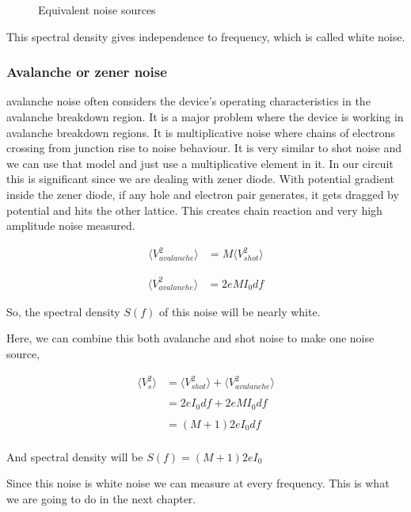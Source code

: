 \documentclass[12pt]{article}
\begin{document}
\begin{figure}[hbt!]
\caption{Equivalent noise sources}
\end{figure}

This spectral density gives independence to frequency, which is called white noise. 


\subsubsection{Avalanche or zener noise \label{than}}

avalanche noise often considers the device's operating characteristics in the avalanche breakdown region. It is a major problem where the device is working in avalanche breakdown regions. It is multiplicative noise where chains of electrons crossing from junction rise to noise behaviour. It is very similar to shot noise and we can use that model and just use a multiplicative element in it. In our circuit this is significant since we are dealing with zener diode. With potential gradient inside the zener diode, if any hole and electron pair generates, it gets dragged by potential and hits the other lattice. This creates chain reaction and very high amplitude noise measured.


\begin{align*}
\langle V_{avalanche}^2\rangle & = M \langle V_{shot}^2\rangle
\end{align*}

\begin{align}\label{thavvo}
\langle V_{avalanche}^2\rangle & = 2 e M I_0 df
\end{align}

So, the spectral density $S(f)$ of this noise will be nearly white.
 
Here, we can combine this both avalanche and shot noise to make one noise source,

\begin{align*}
\langle V_{s}^2\rangle & = \langle V_{shot}^2\rangle+\langle V_{avalanche}^2\rangle\\
\\
& = 2 e I_0 df + 2 e M I_0 df\\
\\
& = (M+1) 2 e I_0 df\\
\end{align*}

And spectral density will be $S(f) = (M+1) 2 e I_0$

Since this noise is white noise we can measure at every frequency. This is what we are going to do in the next chapter. 
\end{document}
